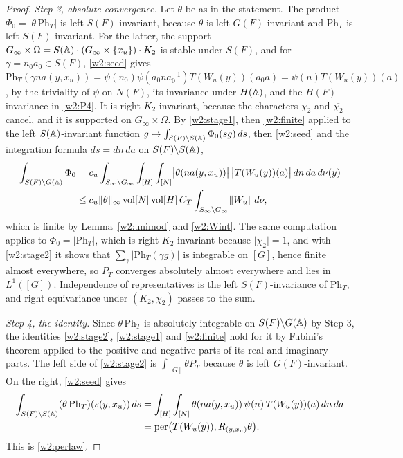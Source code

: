 \begin{proof}
\emph{Step 3, absolute convergence.} Let $\theta$ be as in the statement. The product $\Phi_0=\lvert\theta\,\mathrm{Ph}_T\rvert$ is left $S(F)$-invariant, because $\theta$ is left $G(F)$-invariant and $\mathrm{Ph}_T$ is left $S(F)$-invariant. For the latter, the support $G_\infty\times\Omega=S(\mathbb A)\cdot(G_\infty\times\{x_u\})\cdot K_2$ is stable under $S(F)$, and for $\gamma=n_0a_0\in S(F)$, \eqref{w2:seed} gives $\mathrm{Ph}_T(\gamma na(y,x_u))=\psi(n_0)\psi(a_0na_0^{-1})T(W_u(y))(a_0a)=\psi(n)T(W_u(y))(a)$, by the triviality of $\psi$ on $N(F)$, its invariance under $H(\mathbb A)$, and the $H(F)$-invariance in \ref{w2:P4}. It is right $K_2$-invariant, because the characters $\chi_2$ and $\overline{\chi_2}$ cancel, and it is supported on $G_\infty\times\Omega$. By \eqref{w2:stage1}, then \eqref{w2:finite} applied to the left $S(\mathbb A)$-invariant function $g\mapsto\int_{S(F)\backslash S(\mathbb A)}\Phi_0(sg)\,ds$, then \eqref{w2:seed} and the integration formula $ds=dn\,da$ on $S(F)\backslash S(\mathbb A)$,
\begin{align*}
\int_{S(F)\backslash G(\mathbb A)}\Phi_0
&=c_u\int_{S_\infty\backslash G_\infty}\int_{[H]}\int_{[N]}\bigl\lvert\theta(na(y,x_u))\bigr\rvert\,\bigl\lvert T(W_u(y))(a)\bigr\rvert\,dn\,da\,d\nu(y)\\
&\le c_u\lVert\theta\rVert_\infty\operatorname{vol}[N]\operatorname{vol}[H]\,C_T\int_{S_\infty\backslash G_\infty}\lVert W_u\rVert\,d\nu,
\end{align*}
which is finite by Lemma~\ref{w2:unimod} and \eqref{w2:Wint}. The same computation applies to $\Phi_0=\lvert\mathrm{Ph}_T\rvert$, which is right $K_2$-invariant because $\lvert\chi_2\rvert=1$, and with \eqref{w2:stage2} it shows that $\sum_\gamma\lvert\mathrm{Ph}_T(\gamma g)\rvert$ is integrable on $[G]$, hence finite almost everywhere, so $P_T$ converges absolutely almost everywhere and lies in $L^1([G])$. Independence of representatives is the left $S(F)$-invariance of $\mathrm{Ph}_T$, and right equivariance under $(K_2,\chi_2)$ passes to the sum.

\emph{Step 4, the identity.} Since $\theta\,\mathrm{Ph}_T$ is absolutely integrable on $S(F)\backslash G(\mathbb A)$ by Step 3, the identities \eqref{w2:stage2}, \eqref{w2:stage1} and \eqref{w2:finite} hold for it by Fubini's theorem applied to the positive and negative parts of its real and imaginary parts. The left side of \eqref{w2:stage2} is $\int_{[G]}\theta P_T$ because $\theta$ is left $G(F)$-invariant. On the right, \eqref{w2:seed} gives
\[
\begin{aligned}
\int_{S(F)\backslash S(\mathbb A)}(\theta\,\mathrm{Ph}_T)(s(y,x_u))\,ds&=\int_{[H]}\int_{[N]}\theta(na(y,x_u))\,\psi(n)\,T(W_u(y))(a)\,dn\,da\\
&=\mathrm{per}\bigl(T(W_u(y)),R_{(y,x_u)}\theta\bigr).
\end{aligned}
\]
This is \eqref{w2:perlaw}.
\end{proof}

